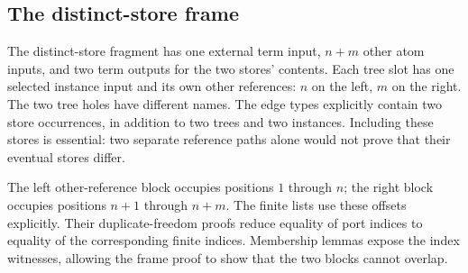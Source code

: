 


\subsection{The distinct-store frame}

The distinct-store fragment has one external term input, $n+m$ other atom
inputs, and two term outputs for the two stores' contents. Each tree slot
has one selected instance input and its own other references: $n$ on the
left, $m$ on the right. The two tree holes have different names. The edge
types explicitly contain two store occurrences, in addition to two trees
and two instances. Including these stores is essential: two separate
reference paths alone would not prove that their eventual stores differ.





The left other-reference block occupies positions $1$ through $n$; the
right block occupies positions $n+1$ through $n+m$. The finite lists use
these offsets explicitly. Their duplicate-freedom proofs reduce equality
of port indices to equality of the corresponding finite indices. Membership
lemmas expose the index witnesses, allowing the frame proof to show that
the two blocks cannot overlap.





